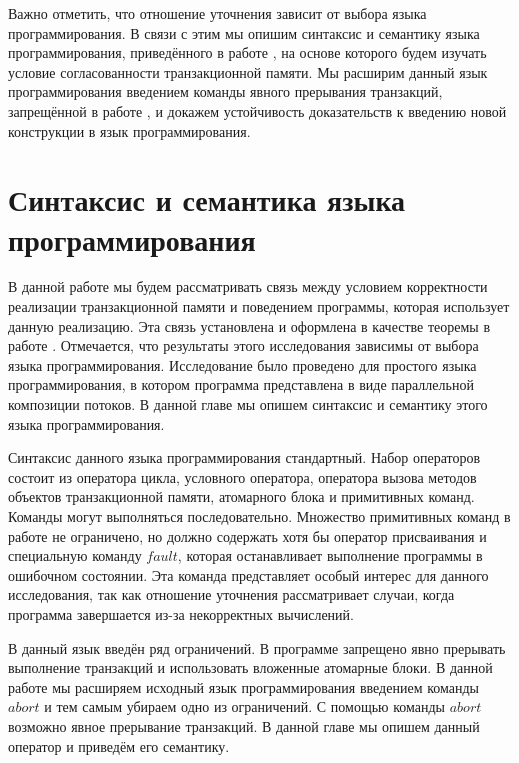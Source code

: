 Важно отметить, что отношение уточнения зависит от выбора языка программирования. В связи с этим мы опишим синтаксис и семантику языка программирования, приведённого в работе \cite{tms_article}, на основе которого будем изучать условие согласованности транзакционной памяти. Мы расширим данный язык программирования введением команды явного прерывания транзакций, запрещённой в работе \cite{tms_article}, и докажем устойчивость доказательств к введению новой конструкции в язык программирования.

\chapter{Синтаксис и семантика языка программирования}
В данной работе мы будем рассматривать связь между условием корректности реализации транзакционной памяти и поведением программы, которая использует данную реализацию. Эта связь установлена и оформлена в качестве теоремы в работе \cite{tms_article}. Отмечается, что результаты этого исследования зависимы от выбора языка программирования. Исследование \cite{tms_article} было проведено для простого языка программирования, в котором программа представлена в виде параллельной композиции потоков. В данной главе мы опишем синтаксис и семантику этого языка программирования.

Синтаксис данного языка программирования стандартный. Набор операторов состоит из оператора цикла, условного оператора, оператора вызова методов объектов транзакционной памяти, атомарного блока и примитивных команд. Команды могут выполняться последовательно. Множество примитивных команд в работе \cite{tms_article} не ограничено, но должно содержать хотя бы оператор присваивания и специальную команду $fault$, которая останавливает выполнение программы в ошибочном состоянии. Эта команда представляет особый интерес для данного исследования, так как отношение уточнения рассматривает случаи, когда программа завершается из-за некорректных вычислений.

В данный язык \cite{tms_article} введён ряд ограничений. В программе запрещено явно прерывать выполнение транзакций и использовать вложенные атомарные блоки. В данной работе мы расширяем исходный язык программирования введением команды $abort$ и тем самым убираем одно из ограничений. С помощью команды $abort$ возможно явное прерывание транзакций. В данной главе мы опишем данный оператор и приведём его семантику.

